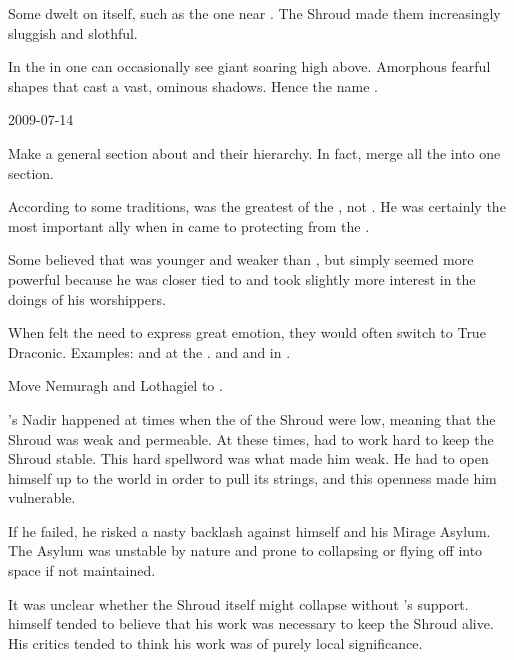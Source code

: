Some \xss dwelt on \Miith itself, such as the one near \Yormis.
The Shroud made them increasingly sluggish and slothful. 



In the \wylde in \Azmith one can occasionally see giant \umbrae soaring high above. 
Amorphous fearful shapes that cast a vast, ominous shadows.
Hence the name \quo{\umbra}. 



2009-07-14

Make a general section about \xss and their hierarchy. In fact, merge all the \xss into one section. 

According to some traditions, \NaathKurRamalech was the greatest of the \xss, not \DzyrochNathla.
He was certainly the \pps{\dragons} most important ally when in came to protecting \Miith from the \banes. 

Some believed that \NaathKurRamalech was younger and weaker than \DzyrochNathla, but simply seemed more powerful because he was closer tied to \Miith and took slightly more interest in the doings of his \Miithian worshippers. 



When \dragons felt the need to express great emotion, they would often switch to True \\Draconic. 
Examples: 
  \Ishnaruchaefir and \Rystessakhin at the \Shrouding. 
  \Ishnaruchaefir and \Nzessuacrith and \Secherdamon in \TwilightAngelRemember.



Move Nemuragh and Lothagiel to \TiphredSerah. 



\Ishnaruchaefir's Nadir happened at times when the  of the Shroud were low, meaning that the Shroud was weak and permeable. 
At these times, \Ishnaruchaefir had to work hard to keep the Shroud stable. 
This hard spellword was what made him weak. 
He had to open himself up to the world in order to pull its strings, and this openness made him vulnerable. 

If he failed, he risked a nasty backlash against himself and his Mirage Asylum. 
The Asylum was unstable by nature and prone to collapsing or flying off into space if not maintained. 

It was unclear whether the Shroud itself might collapse without \Ishnaruchaefir's support. 
\Ishnaruchaefir himself tended to believe that his work was necessary to keep the Shroud alive.
His critics tended to think his work was of purely local significance. 

